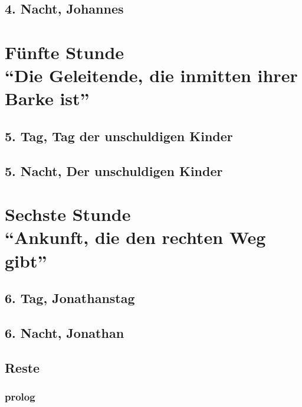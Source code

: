 \documentclass[11pt,titlepage,a5paper]{book}
\begin{document}
\chapter*{4. Nacht, Johannes}


\part*{Fünfte Stunde\\"`Die Geleitende, die inmitten ihrer Barke ist"'}

\chapter*{5. Tag, Tag der unschuldigen Kinder}

\chapter*{5. Nacht, Der unschuldigen Kinder}


\part*{Sechste Stunde\\"`Ankunft, die den rechten Weg gibt"'}

\chapter*{6. Tag, Jonathanstag}

\chapter*{6. Nacht, Jonathan}


\chapter*{Reste}

\section*{prolog}
\end{document}
